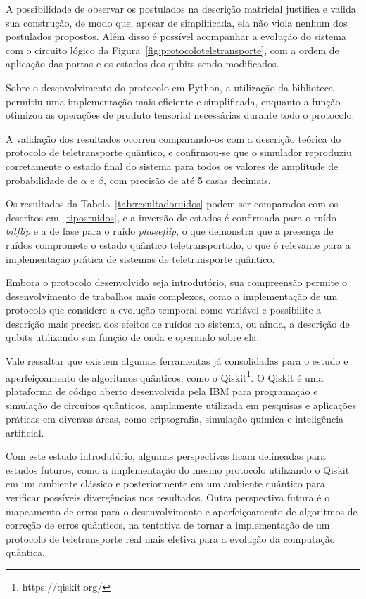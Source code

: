A possibilidade de observar os postulados na descrição matricial justifica e valida sua construção, de modo que, apesar de simplificada, ela não viola nenhum dos postulados propostos. Além disso é possível acompanhar a evolução do sistema com o circuito lógico da Figura~\ref{fig:protocoloteletransporte}, com a ordem de aplicação das portas e os estados dos qubits sendo modificados.

Sobre o desenvolvimento do protocolo em Python, a utilização da biblioteca  permitiu uma implementação mais eficiente e simplificada, enquanto a função  otimizou as operações de produto tensorial necessárias durante todo o protocolo.

A validação dos resultados ocorreu comparando-os com a descrição teórica do protocolo de teletransporte quântico, e confirmou-se que o simulador reproduziu corretamente o estado final do sistema para todos os valores de amplitude de probabilidade de $\alpha$ e $\beta$, com precisão de até 5 casas decimais.

Os resultados da Tabela~\ref{tab:resultadoruidos} podem ser comparados com os descritos em~\ref{tiposruidos}, e a inversão de estados é confirmada para o ruído \textit{bitflip} e a de fase para o ruído \textit{phaseflip}, o que demonstra que a presença de ruídos compromete o estado quântico teletransportado, o que é relevante para a implementação prática de sistemas de teletransporte quântico.

Embora o protocolo desenvolvido seja introdutório, sua compreensão permite o desenvolvimento de trabalhos mais complexos, como a implementação de um protocolo que considere a evolução temporal como variável e possibilite a descrição mais precisa dos efeitos de ruídos no sistema, ou ainda, a descrição de qubits utilizando sua função de onda e operando sobre ela.

Vale ressaltar que existem algumas ferramentas já consolidadas para o estudo e aperfeiçoamento de algoritmos quânticos, como o Qiskit\footnote{https://qiskit.org/}. O Qiskit é uma plataforma de código aberto desenvolvida pela IBM para programação e simulação de circuitos quânticos, amplamente utilizada em pesquisas e aplicações práticas em diversas áreas, como criptografia, simulação química e inteligência artificial.

Com este estudo introdutório, algumas perspectivas ficam delineadas para estudos futuros, como a implementação do mesmo protocolo utilizando o Qiskit em um ambiente clássico e posteriormente em um ambiente quântico para verificar possíveis divergências nos resultados. Outra perspectiva futura é o mapeamento de erros para o desenvolvimento e aperfeiçoamento de algoritmos de correção de erros quânticos, na tentativa de tornar a implementação de um protocolo de teletransporte real mais efetiva para a evolução da computação quântica.


